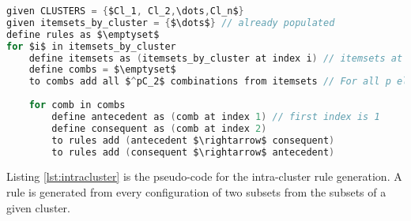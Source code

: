 \begin{lstlisting}[language=C, mathescape=true, caption=Intra-Cluster Rule Generation, label=lst:intracluster]
given CLUSTERS = {$Cl_1, Cl_2,\dots,Cl_n$}
given itemsets_by_cluster = {$\dots$} // already populated
define rules as $\emptyset$
for $i$ in itemsets_by_cluster
    define itemsets as (itemsets_by_cluster at index i) // itemsets at $i^{th}$ cluster.
    define combs = $\emptyset$
    to combs add all $^pC_2$ combinations from itemsets // For all p elements in itemsets
    
    for comb in combs
        define antecedent as (comb at index 1) // first index is 1
        define consequent as (comb at index 2)
        to rules add (antecedent $\rightarrow$ consequent)
        to rules add (consequent $\rightarrow$ antecedent) 
\end{lstlisting}
Listing \ref{lst:intracluster} is the pseudo-code for the intra-cluster rule generation. A rule is generated from every configuration of two subsets from the subsets of a given cluster.


